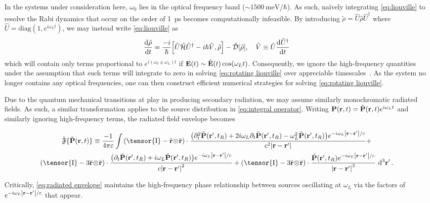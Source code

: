 In the systems under consideration here, $\omega_0$ lies in the optical frequency band ($\sim \SI{1500}{\milli\eV\per\hbar}$).
As such, na\"ively integrating \cref{eq:liouville} to resolve the Rabi dynamics that occur on the order of \SI{1}{\pico\second} becomes computationally infeasible.
By introducing $\tilde{\rho} = \hat{U} \hat{\rho} \hat{U}^\dagger$ where $\hat{U} = \mathrm{diag}(1, e^{i \omega_L t})$, we may instead write \cref{eq:liouville} as
\begin{equation}
  \dv{\tilde{\rho}}{t} = \frac{-i}{\hbar} \commutator{\hat{U} \hat{\mathcal{H}} \hat{U}^\dagger - i \hbar \hat{V}}{\tilde{\rho}} - \hat{\mathcal{D}}\qty[\tilde{\rho}], \quad \hat{V} \equiv \hat{U} \dv{\hat{U}^\dagger}{t}
  \label{eq:rotating liouville}
\end{equation}
which will contain only terms proportional to $e^{i (\omega_0 \pm \omega_L) t}$ if $\vb{E}(t) \sim \tilde{\vb{E}}(t)\cos(\omega_L t)$.
Consequently, we ignore the high-frequency quantities under the assumption that such terms will integrate to zero in solving \cref{eq:rotating liouville} over appreciable timescales~\cite{Allen1975}. As the system no longer contains any optical frequencies, one can then construct efficient numerical strategies for solving \cref{eq:rotating liouville}.

Due to the quantum mechanical transitions at play in producing secondary radiation, we may assume similarly monochromatic radiated fields.
As such, a similar transformation applies to the source distribution in \cref{eq:integral operator}.
Writing $\vb{P}(\vb{r}, t) = \tilde{\vb{P}}(\vb{r}, t)e^{i \omega_L t}$ and similarly ignoring high-frequency terms, the radiated field envelope becomes
\begin{widetext}
\begin{equation}
  \begin{gathered}
    \tilde{\mathfrak{F}}\{ \tilde{\vb{P}}(\vb{r}, t) \} \equiv \frac{-1}{4\pi \varepsilon} \int
    \qty(\tensor{\mathrm{I}} -  \outerprod{\bar{\vb{r}}}{\bar{\vb{r}}} ) \cdot \frac{\qty(\partial_t^2 \tilde{\vb{P}}(\vb{r}', t_R) + 2 i \omega_L \partial_t \tilde{\vb{P}}(\vb{r}', t_R) - \omega_L^2 \tilde{\vb{P}}(\vb{r}', t_R)) e^{-i \omega_L \abs{\vb{r} - \vb{r}'}/c}}{c^2 \abs{\vb{r}-\vb{r}'}} + \\
    \qty(\tensor{\mathrm{I}} - 3\outerprod{\bar{\vb{r}}}{\bar{\vb{r}}} ) \cdot \frac{\qty(\partial_t \tilde{\vb{P}}(\vb{r}', t_R) + i \omega_L \tilde{\vb{P}}(\vb{r}', t_R))e^{-i \omega_L \abs{\vb{r} - \vb{r}'}/c}}{c \abs{\vb{r}-\vb{r}'}^2} +
    \qty(\tensor{\mathrm{I}} - 3\outerprod{\bar{\vb{r}}}{\bar{\vb{r}}} ) \cdot \frac{                \tilde{\vb{P}}(\vb{r}', t_R) e^{-i \omega_L \abs{\vb{r} - \vb{r}'}/c}}{\abs{\vb{r}-\vb{r}'}^3}
    \, \dd[3]{\vb{r'}}.
  \end{gathered}
  \label{eq:radiated envelope}
\end{equation}
\end{widetext}
Critically, \cref{eq:radiated envelope} maintains the high-frequency phase relationship between sources oscillating at $\omega_L$ via the factors of $e^{-i \omega_L \abs{\vb{r} - \vb{r}'}/c}$ that appear.
